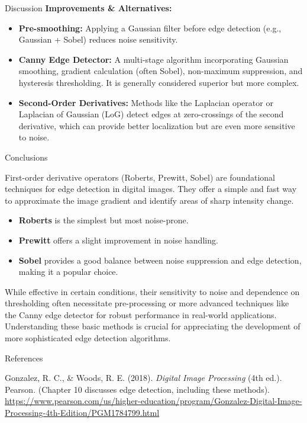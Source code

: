 \documentclass[final]{beamer}
\newlength{\colwidth}
\begin{document}
\begin{frame}[t]
\begin{columns}[t]
\begin{column}{\colwidth}
\begin{block}{Discussion}
    \textbf{Improvements \& Alternatives:} 
    \begin{itemize}
        \item \textbf{Pre-smoothing:} Applying a Gaussian filter before edge detection (e.g., Gaussian + Sobel) reduces noise sensitivity.
        \item \textbf{Canny Edge Detector:} A multi-stage algorithm incorporating Gaussian smoothing, gradient calculation (often Sobel), non-maximum suppression, and hysteresis thresholding. It is generally considered superior but more complex.
        \item \textbf{Second-Order Derivatives:} Methods like the Laplacian operator or Laplacian of Gaussian (LoG) detect edges at zero-crossings of the second derivative, which can provide better localization but are even more sensitive to noise.
    \end{itemize}
  \endgroup
\end{block}
  \begin{block}{Conclusions}
  
    First-order derivative operators (Roberts, Prewitt, Sobel) are foundational techniques for edge detection in digital images. They offer a simple and fast way to approximate the image gradient and identify areas of sharp intensity change.
    \begin{itemize}
        \item \textbf{Roberts} is the simplest but most noise-prone.
        \item \textbf{Prewitt} offers a slight improvement in noise handling.
        \item \textbf{Sobel} provides a good balance between noise suppression and edge detection, making it a popular choice.
    \end{itemize}
    While effective in certain conditions, their sensitivity to noise and dependence on thresholding often necessitate pre-processing or more advanced techniques like the Canny edge detector for robust performance in real-world applications. Understanding these basic methods is crucial for appreciating the development of more sophisticated edge detection algorithms.
  \end{block}

  \begin{block}{References}
    \begin{thebibliography}{9} 
        Gonzalez, R. C., \& Woods, R. E. (2018). \textit{Digital Image Processing} (4th ed.). Pearson.
        \newblock (Chapter 10 discusses edge detection, including these methods). \url{https://www.pearson.com/us/higher-education/program/Gonzalez-Digital-Image-Processing-4th-Edition/PGM1784799.html}


\end{thebibliography}
\end{block}
\end{column}
\end{columns}
\end{frame}
\end{document}
